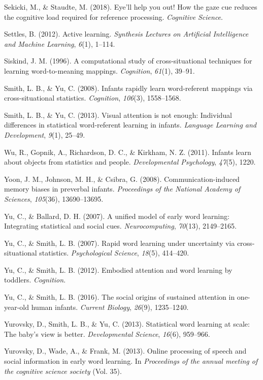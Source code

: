 \documentclass[man,floatsintext]{apa6}
\begin{document}
\hypertarget{ref-sekicki2018eye}{}
Sekicki, M., \& Staudte, M. (2018). Eye'll help you out! How the gaze
cue reduces the cognitive load required for reference processing.
\emph{Cognitive Science}.

\hypertarget{ref-settles2012active}{}
Settles, B. (2012). Active learning. \emph{Synthesis Lectures on
Artificial Intelligence and Machine Learning}, \emph{6}(1), 1--114.

\hypertarget{ref-siskind1996computational}{}
Siskind, J. M. (1996). A computational study of cross-situational
techniques for learning word-to-meaning mappings. \emph{Cognition},
\emph{61}(1), 39--91.

\hypertarget{ref-smith2008infants}{}
Smith, L. B., \& Yu, C. (2008). Infants rapidly learn word-referent
mappings via cross-situational statistics. \emph{Cognition},
\emph{106}(3), 1558--1568.

\hypertarget{ref-smith2013visual}{}
Smith, L. B., \& Yu, C. (2013). Visual attention is not enough:
Individual differences in statistical word-referent learning in infants.
\emph{Language Learning and Development}, \emph{9}(1), 25--49.

\hypertarget{ref-wu2011infants}{}
Wu, R., Gopnik, A., Richardson, D. C., \& Kirkham, N. Z. (2011). Infants
learn about objects from statistics and people. \emph{Developmental
Psychology}, \emph{47}(5), 1220.

\hypertarget{ref-yoon2008communication}{}
Yoon, J. M., Johnson, M. H., \& Csibra, G. (2008). Communication-induced
memory biases in preverbal infants. \emph{Proceedings of the National
Academy of Sciences}, \emph{105}(36), 13690--13695.

\hypertarget{ref-yu2007unified}{}
Yu, C., \& Ballard, D. H. (2007). A unified model of early word
learning: Integrating statistical and social cues.
\emph{Neurocomputing}, \emph{70}(13), 2149--2165.

\hypertarget{ref-yu2007rapid}{}
Yu, C., \& Smith, L. B. (2007). Rapid word learning under uncertainty
via cross-situational statistics. \emph{Psychological Science},
\emph{18}(5), 414--420.

\hypertarget{ref-yu2012embodied}{}
Yu, C., \& Smith, L. B. (2012). Embodied attention and word learning by
toddlers. \emph{Cognition}.

\hypertarget{ref-yu2016social}{}
Yu, C., \& Smith, L. B. (2016). The social origins of sustained
attention in one-year-old human infants. \emph{Current Biology},
\emph{26}(9), 1235--1240.

\hypertarget{ref-yurovsky2013statistical}{}
Yurovsky, D., Smith, L. B., \& Yu, C. (2013). Statistical word learning
at scale: The baby's view is better. \emph{Developmental Science},
\emph{16}(6), 959--966.

\hypertarget{ref-yurovsky2013online}{}
Yurovsky, D., Wade, A., \& Frank, M. (2013). Online processing of speech
and social information in early word learning. In \emph{Proceedings of
the annual meeting of the cognitive science society} (Vol. 35).

\endgroup
\end{document}
